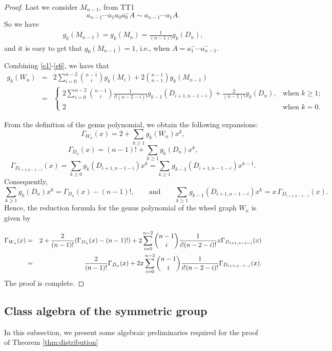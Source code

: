 \documentclass[12pt]{article}
\theoremstyle{definition}
\begin{document}
\begin{proof}
Last we consider $M_{n-1}$, from TT1
$$a_{n-1}\cdots a_{1}a_{0}a^{-}_{0}A\sim a_{n-1}\cdots a_{1}A.$$
So we have
\begin{eqnarray}\label{e6}
g_k(M_{n-1})=g_k(M_n)=\frac{1}{(n-1)!}g_{k}(D_{n}),\end{eqnarray}
and it is easy to get that $g_0(M_{n-1})=1$, i.e., when $A=a_1^-\cdots a_{n-1}^-$.

Combining \eqref{e1}-\eqref{e6}, we have that
\begin{eqnarray}\label{e7}
g_k(W_n)
&=& 2\sum\limits_{i=0}^{n-2}\binom{n-1}{i}g_k(M_i)+2\binom{n-1}{n-1}g_k(M_{n-1})\nonumber\\
&=& \left\{\begin{array}{cc}
              2\sum\limits_{i=0}^{n-2}\binom{n-1}{i}\frac{1}{i!(n-2-i)!}g_{k-1}(D_{i+1,n-1-i})+\frac{2}{(n-1)!}g_k(D_{n}),& \mbox{when $k\geq 1;$}\\
               2& \mbox{when $k=0$.}
              \end{array}\right.
\end{eqnarray}

 From the definition of the genus polynomial, we obtain the following expansions:
$$\Gamma_{W_n}(x) = 2 + \sum_{k\ge 1} g_k(W_n)x^k,$$
$$\Gamma_{D_n}(x) = (n-1)! + \sum_{k\ge 1} g_k(D_n)x^k,$$
$$\Gamma_{D_{i+1,n-1-i}}(x) = \sum_{k\ge 0} g_k(D_{i+1,n-1-i})x^k = \sum_{k\ge 1} g_{k-1}(D_{i+1,n-1-i})x^{k-1}.$$
Consequently,
\[
\sum_{k\ge 1} g_k(D_n)x^k = \Gamma_{D_n}(x) - (n-1)!,
\qquad\mbox{and}\qquad
\sum_{k\ge 1} g_{k-1}(D_{i+1,n-1-i})x^k = x\,\Gamma_{D_{i+1,n-1-i}}(x).
\]
Hence, the reduction formula for the genus polynomial of the wheel graph $W_n$ is given by

\begin{eqnarray*}
\Gamma_{W_n}(x)&=&2+\frac{2}{(n-1)!}(\Gamma_{D_{n}}(x)-(n-1)!)+2\sum\limits_{i=0}^{n-2}\binom{n-1}{i}\frac{1}{i!(n-2-i)!}x\Gamma_{D_{i+1,n-1-i}}(x)\notag\\
&=& \frac{2}{(n-1)!}\Gamma_{D_{n}}(x)+2x\sum\limits_{i=0}^{n-2}\binom{n-1}{i}\frac{1}{i!(n-2-i)!}\Gamma_{D_{i+1,n-1-i}}(x).
\end{eqnarray*}
The proof is complete.
\end{proof}



\subsection{Class algebra of the symmetric group}
In this subsection, we present some algebraic preliminaries required for the proof of Theorem \ref{thm:distribution}
\end{document}
